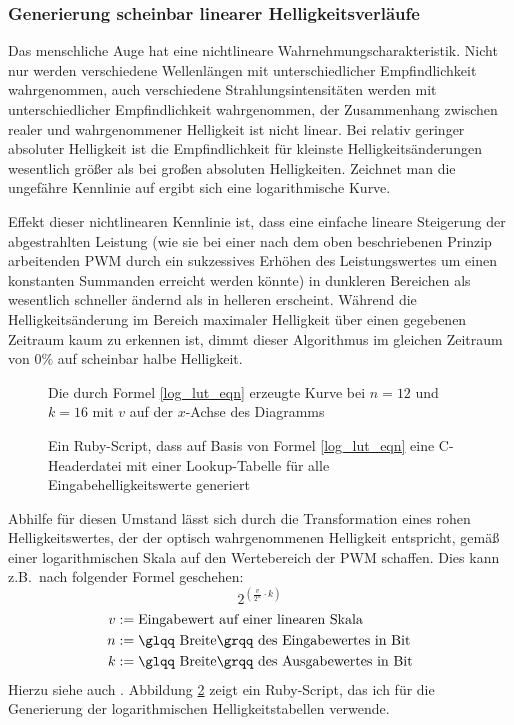 \documentclass[12pt,a4paper,notitlepage]{article}
\begin{document}
\subsubsection{Generierung scheinbar linearer Helligkeitsverläufe}
Das menschliche Auge hat eine nichtlineare Wahrnehmungscharakteristik. Nicht nur werden verschiedene Wellenlängen mit unterschiedlicher Empfindlichkeit wahrgenommen, auch verschiedene Strahlungsintensitäten werden mit unterschiedlicher Empfindlichkeit wahrgenommen, der Zusammenhang zwischen realer und wahrgenommener Helligkeit ist nicht linear. Bei relativ geringer absoluter Helligkeit ist die Empfindlichkeit für kleinste Helligkeitsänderungen wesentlich größer als bei großen absoluten Helligkeiten. Zeichnet man die ungefähre Kennlinie auf ergibt sich eine logarithmische Kurve.

Effekt dieser nichtlinearen Kennlinie ist, dass eine einfache lineare Steigerung der abgestrahlten Leistung (wie sie bei einer nach dem oben beschriebenen Prinzip arbeitenden \gls{PWM} durch ein sukzessives Erhöhen des Leistungswertes um einen konstanten Summanden erreicht werden könnte) in dunkleren Bereichen als wesentlich schneller ändernd als in helleren erscheint. Während die Helligkeitsänderung im Bereich maximaler Helligkeit über einen gegebenen Zeitraum kaum zu erkennen ist, dimmt dieser Algorithmus im gleichen Zeitraum von $0\%$ auf scheinbar halbe Helligkeit.

\begin{figure}
\begin{center}

\end{center}
\caption{Die durch Formel \ref{log_lut_eqn} erzeugte Kurve bei $n=12$ und $k=16$ mit $v$ auf der $x$-Achse des Diagramms}
\label{log_lut_diagram}
\end{figure}

\begin{figure}

\caption{Ein Ruby-Script, dass auf Basis von Formel \ref{log_lut_eqn} eine C-Headerdatei mit einer Lookup-Tabelle für alle Eingabehelligkeitswerte generiert}
\label{log_lut_gen}
\end{figure}

Abhilfe für diesen Umstand lässt sich durch die Transformation eines rohen Helligkeitswertes, der der optisch wahrgenommenen Helligkeit entspricht, gemäß einer logarithmischen Skala auf den Wertebereich der \gls{PWM} schaffen. Dies kann z.B.\ nach folgender Formel geschehen:
\begin{equation}
2^{\left(\frac{\scriptstyle v}{\scriptstyle 2^n}\cdot k\right)}
\label{log_lut_eqn}
\end{equation}
\begin{align}
v&:=\text{Eingabewert auf einer linearen Skala}\\
n&:=\text{\glqq Breite\grqq\ des Eingabewertes in Bit}\\
k&:=\text{\glqq Breite\grqq\  des Ausgabewertes in Bit}
\end{align}
Hierzu siehe auch \cite{MAXIM41,MAXIM57,SIART1}. Abbildung \ref{log_lut_gen} %
zeigt ein Ruby-Script, das ich für die Generierung der logarithmischen Helligkeitstabellen verwende.
\end{document}
